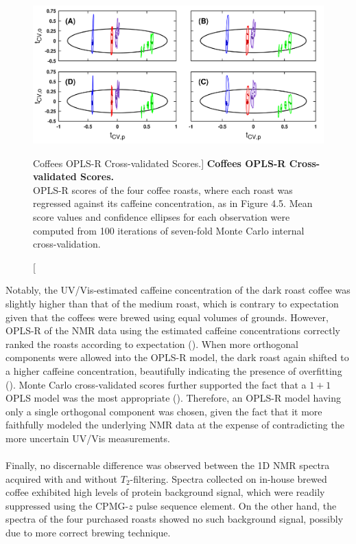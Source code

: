 \begin{figure}[H]
\includegraphics[width=6.5in]{figs/apps/06-oplsr-tcv.png}
\caption
      [Coffees OPLS-R Cross-validated Scores.]{
  {\bf Coffees OPLS-R Cross-validated Scores.}
  \\
  OPLS-R scores of the four coffee roasts, where each roast was regressed
  against its caffeine concentration, as in Figure 4.5. Mean score values
  and confidence ellipses for each observation were computed from 100
  iterations of seven-fold Monte Carlo internal cross-validation.
}
\label{figure.4.6}
\end{figure}

\begin{doublespace}
Notably, the UV/Vis-estimated caffeine concentration of the dark roast coffee
was slightly higher than that of the medium roast, which is contrary to
expectation given that the coffees were brewed using equal volumes of
grounds. However, OPLS-R of the NMR data using the estimated caffeine
concentrations correctly ranked the roasts according to expectation
(). When more orthogonal components were allowed
into the OPLS-R model, the dark roast again shifted to a higher caffeine
concentration, beautifully indicating the presence of overfitting
(). Monte Carlo cross-validated scores further
supported the fact that a $1+1$ OPLS model was the most appropriate
(). Therefore, an OPLS-R model having only a single
orthogonal component was chosen, given the fact that it more faithfully
modeled the underlying NMR data at the expense of contradicting the more
uncertain UV/Vis measurements.
\\\\
Finally, no discernable difference was observed between the 1D \hnmr{} NMR
spectra acquired with and without $T_2$-filtering. Spectra collected on
in-house brewed coffee exhibited high levels of protein background signal,
which were readily suppressed using the CPMG-$z$ pulse sequence element. On
the other hand, the spectra of the four purchased roasts showed no such
background signal, possibly due to more correct brewing technique.
\end{doublespace}

